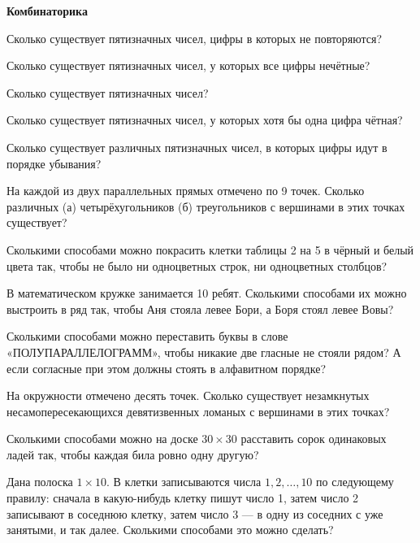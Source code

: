 \documentclass{article}
\begin{document}
    \large


    \begin{center}
        \textbf{Комбинаторика}
    \end{center}

    \begin{enumerate_boxed}

        \setcounter{enumi}{-2}
        \item Сколько существует пятизначных чисел, цифры в которых не повторяются?
        \item Сколько существует пятизначных чисел, у которых все цифры нечётные?
        \item Сколько существует пятизначных чисел?
        \item Сколько существует пятизначных чисел, у которых хотя бы одна цифра чётная?
        \item Сколько существует различных пятизначных чисел, в которых цифры идут в порядке убывания?
        \item На каждой из двух параллельных прямых отмечено по 9 точек.
        Сколько различных (а) четырёхугольников (б) треугольников с вершинами в этих точках существует?
        \item Сколькими способами можно покрасить клетки таблицы 2 на 5 в чёрный и белый цвета так, чтобы не было ни одноцветных строк, ни одноцветных столбцов?
        \item В математическом кружке занимается 10 ребят.
        Сколькими способами их можно
        выстроить в ряд так, чтобы Аня стояла левее Бори, а Боря стоял левее Вовы?
        \item Сколькими способами можно переставить буквы в слове
        «ПОЛУПАРАЛЛЕЛОГРАММ», чтобы никакие две гласные не стояли рядом?
        А если согласные при этом должны стоять в алфавитном порядке?
        \item На окружности отмечено десять точек.
        Сколько существует незамкнутых несамопересекающихся девятизвенных ломаных с вершинами в этих точках?
        \item Сколькими способами можно на доске $30 \times 30$ расставить сорок одинаковых ладей так, чтобы каждая била ровно одну другую?

        \item Дана полоска $1 \times 10$.
        В клетки записываются числа $1, 2, \dotsc , 10$ по следующему правилу: сначала в какую-нибудь клетку пишут число 1, затем число 2 записывают в соседнюю клетку, затем число 3 — в одну из соседних с уже занятыми, и так далее.
        Сколькими способами это можно сделать?


\end{enumerate_boxed}
\end{document}
